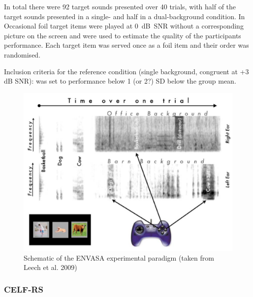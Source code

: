 \documentclass[a4paper,nobind]{templates/ociamthesis}
\begin{document}
In total there were 92 target sounds presented over 40 trials, with half of the target sounds presented in a single- and half in a dual-background condition. In Occasional foil target items were played at 0~dB~SNR without a corresponding picture on the screen and were used to estimate the quality of the participants performance. Each target item was served once as a foil item and their order was randomised.

Inclusion criteria for the reference condition (single background, congruent at +3 dB SNR): was set to performance below 1 (or 2?) SD below the group mean.



\begin{figure}

{\centering \includegraphics[width=0.65\linewidth]{figures/ENVASAparadigm} 

}

\caption{Schematic of the ENVASA experimental paradigm (taken from Leech et al. 2009)}\label{fig:ENVASA}
\end{figure}

\hypertarget{celf-rs}{%
\subsubsection{CELF-RS}\label{celf-rs}}
\end{document}

